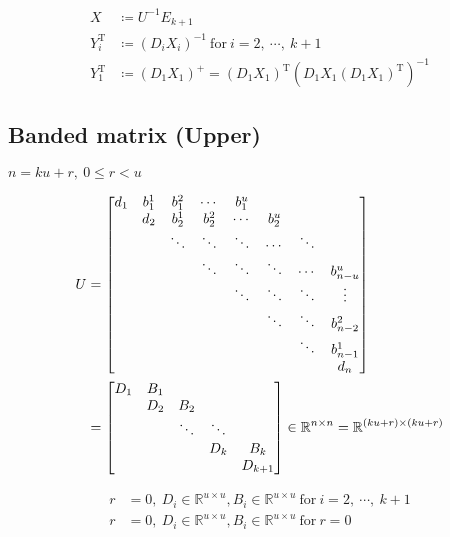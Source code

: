 \documentclass[11pt]{article}
\newcommand{\T}{\mathrm{T}}
\begin{document}
\begin{align*}
    X &\coloneqq U^{-1} E_{k+1} \\
    Y_{i}^{\T} &\coloneqq (D_{i} X_{i})^{-1} \ \text{for}\ i = 2,\ \cdots,\ k+1 \\
    Y_{1}^{\T} &\coloneqq (D_{1} X_{1})^{+} = (D_{1} X_{1})^{\T} (D_{1} X_{1} (D_{1} X_{1})^{\T})^{-1}
\end{align*}







\newpage
\subsection{Banded matrix (Upper)}

$n = ku + r, \ 0\leq r<u$

\begin{align*}
    U &= \mqty[
        d_{1} & b^{1}_{1} & b^{2}_{1} & \cdots & b^{u}_{1} &   &   &   \\
          & d_{2} & b^{1}_{2} & b^{2}_{2} & \cdots & b^{u}_{2} &   &   \\
          &   & \ddots & \ddots & \ddots & \cdots & \ddots &   \\
          &   &   & \ddots & \ddots & \ddots & \cdots & b^{u}_{n-u} \\
          &   &   &   & \ddots & \ddots & \ddots & \vdots \\
          &   &   &   &   & \ddots & \ddots & b^{2}_{n-2} \\
          &   &   &   &   &   & \ddots & b^{1}_{n-1} \\
          &   &   &   &   &   &   & d_{n} \\
    ]\\
    &= \mqty[
        D_{1} & B_{1} &   &   &  \\
          & D_{2} & B_{2} &   &  \\
          &   & \ddots & \ddots &  \\
          &   &   & D_{k} & B_{k}\\
          &   &   &   & D_{k+1}
    ] \in \mathbb{R}^{n \times n} = \mathbb{R}^{(ku + r) \times (ku + r)}
\end{align*}


\begin{align*}
    r &= 0, \ D_{i} \in \mathbb{R}^{u \times u}, B_{i} \in \mathbb{R}^{u \times u} \ \text{for} \ i = 2,\ \cdots,\ k+1 \\
    r &= 0, \ D_{i} \in \mathbb{R}^{u \times u}, B_{i} \in \mathbb{R}^{u \times u} \ \text{for} \ r = 0 \\
\end{align*}
\end{document}
